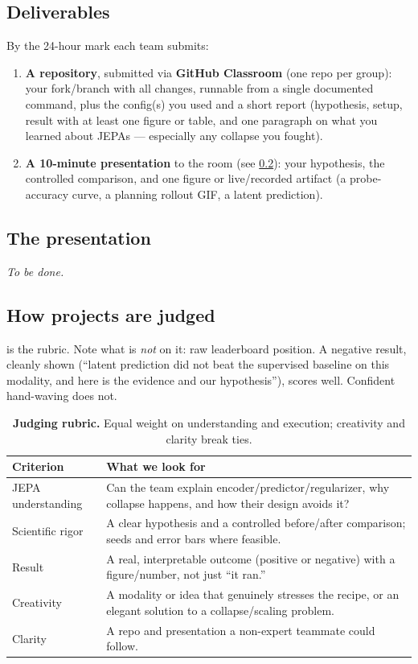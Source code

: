 \documentclass{article}
\begin{document}
\subsection{Deliverables}

By the 24-hour mark each team submits:
\begin{enumerate}[leftmargin=1.6em,itemsep=1pt,topsep=2pt]
  \item \textbf{A repository}, submitted via \textbf{GitHub Classroom} (one repo per
    group): your fork/branch with all changes, runnable from a single documented
    command, plus the config(s) you used and a short report (hypothesis, setup,
    result with at least one figure or table, and one paragraph on what you learned
    about JEPAs --- especially any collapse you fought).
  \item \textbf{A 10-minute presentation} to the room (see \cref{sec:presentation}):
    your hypothesis, the controlled comparison, and one figure or live/recorded
    artifact (a probe-accuracy curve, a planning rollout GIF, a latent prediction).
\end{enumerate}

\subsection{The presentation}
\label{sec:presentation}

\emph{To be done.}

\subsection{How projects are judged}

 is the rubric. Note what is \emph{not} on it: raw leaderboard
position. A negative result, cleanly shown (``latent prediction did not beat the
supervised baseline on this modality, and here is the evidence and our
hypothesis''), scores well. Confident hand-waving does not.

\begin{table}[h]
\centering
\caption{\textbf{Judging rubric.} Equal weight on understanding and execution;
creativity and clarity break ties.}
\label{tab:rubric}
\small
\begin{tabular}{lp{9.6cm}}
\toprule
Criterion & What we look for \\
\midrule
JEPA understanding   & Can the team explain encoder/predictor/regularizer, why collapse happens, and how their design avoids it? \\
Scientific rigor     & A clear hypothesis and a controlled before/after comparison; seeds and error bars where feasible. \\
Result               & A real, interpretable outcome (positive or negative) with a figure/number, not just ``it ran.'' \\
Creativity           & A modality or idea that genuinely stresses the recipe, or an elegant solution to a collapse/scaling problem. \\
Clarity              & A repo and presentation a non-expert teammate could follow. \\
\bottomrule
\end{tabular}
\end{table}
\end{document}
